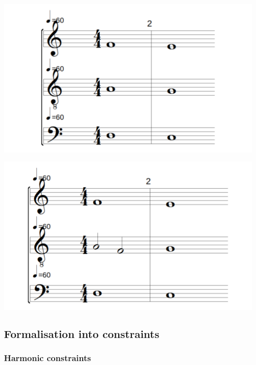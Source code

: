 \begin{enumerate}[wide, label=\bfseries 2.P\arabic*]
\vspace{.5cm}
\begin{minipage}{0.46\textwidth}
    \centering
    \includegraphics[width=\textwidth]{Images/successive-fifths.png}
    \label{fig:successive-fifths-2}
    \end{minipage}
    \hfill
    \begin{minipage}{0.46\textwidth}
      \centering
      \includegraphics[width=\textwidth]{Images/successive-fifths-flanking-a-third.png}
      \label{fig:successive-fifths-2}
\end{minipage}
\end{enumerate}

\subsection{Formalisation into constraints}
\subsubsection{Harmonic constraints}
